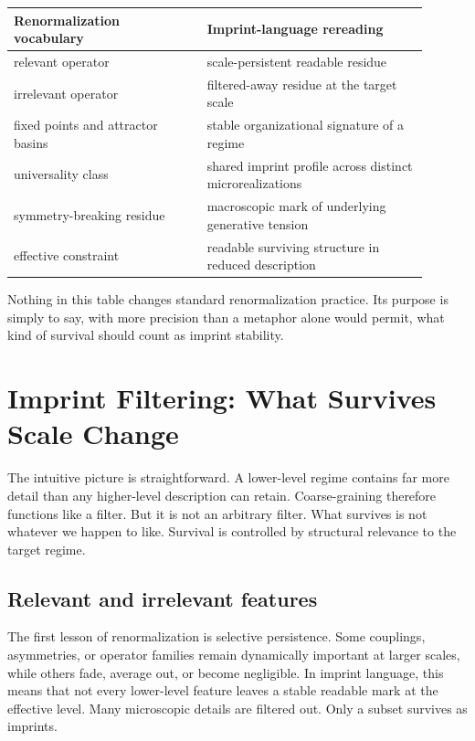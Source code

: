 \documentclass[12pt]{article}
\begin{document}
\begin{center}
\begin{tabular}{P{0.42\linewidth}P{0.48\linewidth}}
\toprule
\textbf{Renormalization vocabulary} & \textbf{Imprint-language rereading} \\
\midrule
relevant operator & scale-persistent readable residue \\
irrelevant operator & filtered-away residue at the target scale \\
fixed points and attractor basins & stable organizational signature of a regime \\
universality class & shared imprint profile across distinct microrealizations \\
symmetry-breaking residue & macroscopic mark of underlying generative tension \\
effective constraint & readable surviving structure in reduced description \\
\bottomrule
\end{tabular}
\end{center}

Nothing in this table changes standard renormalization practice. Its purpose is simply to say, with more precision than a metaphor alone would permit, what kind of survival should count as imprint stability.

\section{Imprint Filtering: What Survives Scale Change}

The intuitive picture is straightforward. A lower-level regime contains far more detail than any higher-level description can retain. Coarse-graining therefore functions like a filter. But it is not an arbitrary filter. What survives is not whatever we happen to like. Survival is controlled by structural relevance to the target regime.

\subsection{Relevant and irrelevant features}

The first lesson of renormalization is selective persistence. Some couplings, asymmetries, or operator families remain dynamically important at larger scales, while others fade, average out, or become negligible. In imprint language, this means that not every lower-level feature leaves a stable readable mark at the effective level. Many microscopic details are filtered out. Only a subset survives as imprints.
\end{document}
